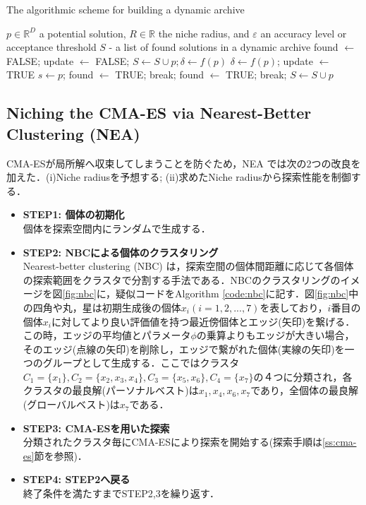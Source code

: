 \documentclass[a4j,11pt]{jarticle}
\begin{document}
\begin{algorithm}[H]
\caption{The algorithmic scheme for building a dynamic archive}
\label{code:dynA}
\begin{algorithmic}[3]
\REQUIRE $p \in \mathbb{R}^D$ a potential solution, $R \in \mathbb{R}$ the niche radius, and $\varepsilon$ an accuracy level or acceptance threshold
\ENSURE $S$ - a list of found solutions in a dynamic archive
\STATE found $\leftarrow$ FALSE; update $\leftarrow$ FALSE;
\STATE $S \leftarrow S \cup {p}; \delta \leftarrow f(p)$
\ELSE
{}
\STATE $\delta \leftarrow f(p)$; update $\leftarrow$ TRUE
\ENDIF
{}
\STATE $s \leftarrow p$;
\STATE found $\leftarrow$ TRUE;
\STATE break;
\ELSE
\STATE found $\leftarrow$ TRUE;
\STATE break;
\ENDIF
\ENDIF
\ENDFOR
{}
\STATE $S \leftarrow S \cup {p}$
\ENDIF
\ENDIF
\ENDIF
\end{algorithmic}
\end{algorithm}

\subsection{Niching the CMA-ES via Nearest-Better Clustering (NEA)}
\label{ss:nea}
CMA-ESが局所解へ収束してしまうことを防ぐため，NEA \cite{nea} では次の2つの改良を加えた．(i)Niche radiusを予想する; (ii)求めたNiche radiusから探索性能を制御する．

\begin{itemize}
\item {\bf STEP1: 個体の初期化} \\
個体を探索空間内にランダムで生成する．
\item {\bf STEP2: NBCによる個体のクラスタリング}\\
Nearest-better clustering (NBC) \cite{NBC} は，探索空間の個体間距離に応じて各個体の探索範囲をクラスタで分割する手法である．NBCのクラスタリングのイメージを図\ref{fig:nbc}に，疑似コードをAlgorithm \ref{code:nbc}に記す．図\ref{fig:nbc}中の四角や丸，星は初期生成後の個体$x_i (i=1,2,...,7)$を表しており，$i$番目の個体$x_i$に対してより良い評価値を持つ最近傍個体とエッジ(矢印)を繋げる．この時，エッジの平均値とパラメータ$\phi$の乗算よりもエッジが大きい場合，そのエッジ(点線の矢印)を削除し，エッジで繋がれた個体(実線の矢印)を一つのグループとして生成する．ここではクラスタ$C_1=\{x_1\}, C_2=\{x_2, x_3, x_4\}, C_3 = \{x_5, x_6\}, C_4=\{x_7\}$の４つに分類され，各クラスタの最良解(パーソナルベスト)は$x_1, x_4, x_6, x_7$であり，全個体の最良解(グローバルベスト)は$x_7$である．
\item {\bf STEP3: CMA-ESを用いた探索} \\
分類されたクラスタ毎にCMA-ESにより探索を開始する(探索手順は\ref{ss:cma-es}節を参照)．
\item {\bf STEP4: STEP2へ戻る}\\
終了条件を満たすまでSTEP2,3を繰り返す．
\end{itemize}
\end{document}
